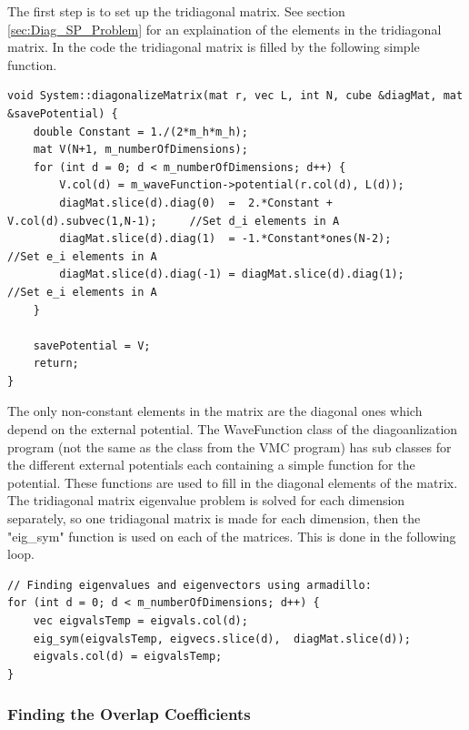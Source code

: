 \documentclass[../main.tex]{subfiles}
\begin{document}
The first step is to set up the tridiagonal matrix. See section \ref{sec:Diag_SP_Problem} for an explaination of the elements in the tridiagonal matrix. In the code the tridiagonal matrix is filled by the following simple function.
\lstset{language=c++}
\begin{lstlisting}[caption={}]
void System::diagonalizeMatrix(mat r, vec L, int N, cube &diagMat, mat &savePotential) {
    double Constant = 1./(2*m_h*m_h);
    mat V(N+1, m_numberOfDimensions);
    for (int d = 0; d < m_numberOfDimensions; d++) {
        V.col(d) = m_waveFunction->potential(r.col(d), L(d));
        diagMat.slice(d).diag(0)  =  2.*Constant + V.col(d).subvec(1,N-1);     //Set d_i elements in A
        diagMat.slice(d).diag(1)  = -1.*Constant*ones(N-2);               //Set e_i elements in A
        diagMat.slice(d).diag(-1) = diagMat.slice(d).diag(1);                         //Set e_i elements in A
    }

    savePotential = V;
    return;
}
\end{lstlisting}
The only non-constant elements in the matrix are the diagonal ones which depend on the external potential. The WaveFunction class of the diagoanlization program (not the same as the class from the VMC program) has sub classes for the different external potentials each containing a simple function for the potential. These functions are used to fill in the diagonal elements of the matrix. The tridiagonal matrix eigenvalue problem is solved for each dimension separately, so one tridiagonal matrix is made for each dimension, then the "eig\_sym" function is used on each of the matrices. This is done in the following loop.
\lstset{language=c++}
\begin{lstlisting}[caption={}]
// Finding eigenvalues and eigenvectors using armadillo:
for (int d = 0; d < m_numberOfDimensions; d++) {
    vec eigvalsTemp = eigvals.col(d);
    eig_sym(eigvalsTemp, eigvecs.slice(d),  diagMat.slice(d));
    eigvals.col(d) = eigvalsTemp;
}
\end{lstlisting}

\subsubsection{Finding the Overlap Coefficients}
\end{document}
